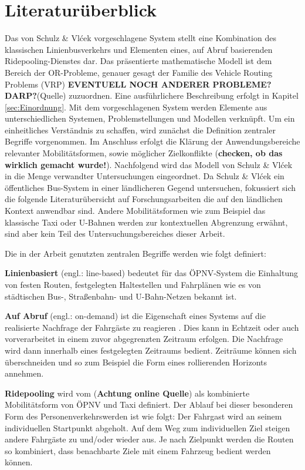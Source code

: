 
\chapter{Literaturüberblick}
\label{chapter:2}
Das von Schulz \& Vlćek vorgeschlagene System stellt eine Kombination des klassischen Linienbusverkehrs und Elementen eines, auf Abruf basierenden Ridepooling-Dienstes dar. Das präsentierte mathematische Modell ist dem Bereich der OR-Probleme, genauer gesagt der Familie des Vehicle Routing Problems (VRP) \textbf{EVENTUELL NOCH ANDERER PROBLEME? DARP?}(Quelle) zuzuordnen. Eine ausführlichere Beschreibung erfolgt in Kapitel \ref{sec:Einordnung}. Mit dem vorgeschlagenen System werden Elemente aus unterschiedlichen Systemen, Problemstellungen und Modellen verknüpft. Um ein einheitliches Verständnis zu schaffen, wird zunächst die Definition zentraler Begriffe vorgenommen. Im Anschluss erfolgt die Klärung der Anwendungsbereiche relevanter Mobilitätsformen, sowie möglicher Zielkonflikte (\textbf{checken, ob das wirklich gemacht wurde!}). Nachfolgend wird das Modell von Schulz \& Vlćek in die Menge verwandter Untersuchungen eingeordnet. Da Schulz \& Vlćek ein öffentliches Bus-System in einer ländlicheren Gegend untersuchen, fokussiert sich die folgende Literaturübersicht auf Forschungsarbeiten die auf den ländlichen Kontext anwendbar sind. Andere Mobilitätsformen wie zum Beispiel das klassische Taxi oder U-Bahnen werden zur kontextuellen Abgrenzung erwähnt, sind aber kein Teil des Untersuchungsbereiches dieser Arbeit.

Die in der Arbeit genutzten zentralen Begriffe werden wie folgt definiert:

\textbf{Linienbasiert} (engl.: line-based) bedeutet für das ÖPNV-System die Einhaltung von festen Routen, festgelegten Haltestellen und Fahrplänen wie es von städtischen Bus-, Straßenbahn- und U-Bahn-Netzen bekannt ist.

\textbf{Auf Abruf} (engl.: on-demand) ist die Eigenschaft eines Systems auf die realisierte Nachfrage der Fahrgäste zu reagieren \parencite[vgl.][S.3]{vansteenwegen_survey_2022}. Dies kann in Echtzeit oder auch vorverarbeitet in einem zuvor abgegrenzten Zeitraum erfolgen. Die Nachfrage wird dann innerhalb eines festgelegten Zeitraums bedient. Zeiträume können sich überschneiden und so zum Beispiel die Form eines rollierenden Horizonts annehmen.

\textbf{Ridepooling} wird vom \textcite[][]{verband_der_automobilindustrie_ridepooling_2025} (\textbf{Achtung online Quelle}) als kombinierte Mobilitätsform von ÖPNV und Taxi definiert. Der Ablauf bei dieser besonderen Form des Personenverkehrswerden ist wie folgt: Der Fahrgast wird an seinem individuellen Startpunkt abgeholt. Auf dem Weg zum individuellen Ziel steigen andere Fahrgäste zu und/oder wieder aus. Je nach Zielpunkt werden die Routen so kombiniert, dass benachbarte Ziele mit einem Fahrzeug bedient werden können.   

